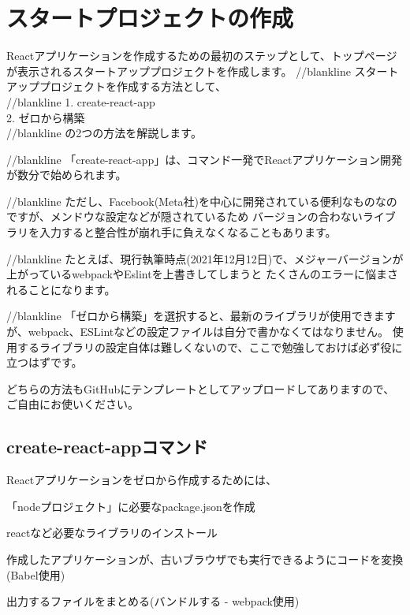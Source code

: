 \chapter{スタートプロジェクトの作成}
\label{chap:02-create-react-app}
\begin{starterabstract}
Reactアプリケーションを作成するための最初のステップとして、トップページが表示されるスタートアッププロジェクトを作成します。
//blankline
スタートアッププロジェクトを作成する方法として、\\[0pt]

//blankline
  1. create{-}react{-}app\\[0pt]
  2. ゼロから構築\\[0pt]
//blankline
の2つの方法を解説します。

//blankline
「create{-}react{-}app」は、コマンド一発でReactアプリケーション開発が数分で始められます。

//blankline
ただし、Facebook(Meta社)を中心に開発されている便利なものなのですが、メンドウな設定などが隠されているため
バージョンの合わないライブラリを入力すると整合性が崩れ手に負えなくなることもあります。

//blankline
たとえば、現行執筆時点(2021年12月12日)で、メジャーバージョンが上がっているwebpackやEslintを上書きしてしまうと
たくさんのエラーに悩まされることになります。

//blankline
「ゼロから構築」を選択すると、最新のライブラリが使用できますが、webpack、ESLintなどの設定ファイルは自分で書かなくてはなりません。
使用するライブラリの設定自体は難しくないので、ここで勉強しておけば必ず役に立つはずです。


どちらの方法もGitHubにテンプレートとしてアップロードしてありますので、ご自由にお使いください。

\end{starterabstract}

\section{create{-}react{-}appコマンド}
\keeplastskip{
  \label{sec:2-1}
  \label{sec-01command}
  \par\nobreak
}

Reactアプリケーションをゼロから作成するためには、\\[0pt]

\begin{starteritemize}
\item 「nodeプロジェクト」に必要なpackage.jsonを作成
\item reactなど必要なライブラリのインストール
\item 作成したアプリケーションが、古いブラウザでも実行できるようにコードを変換(Babel使用)
\item 出力するファイルをまとめる(バンドルする {-} webpack使用)
\end{starteritemize}

